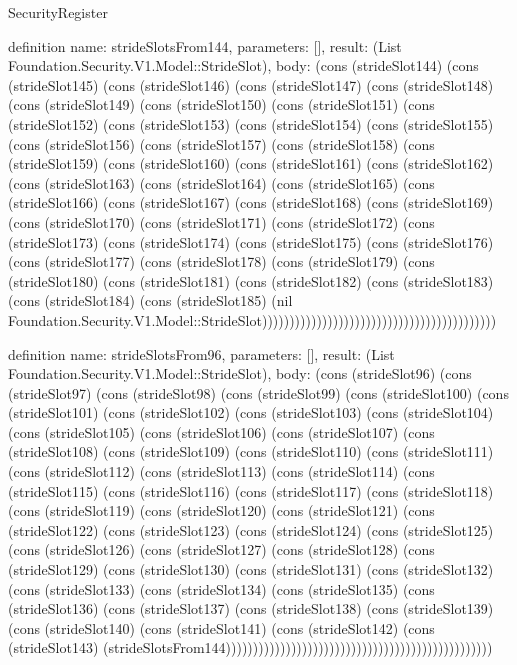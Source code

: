\begin{lexlean}{SecurityRegister}
\begin{semanticmodule}
definition{
  name: strideSlotsFrom144,
  parameters: [],
  result: (List Foundation.Security.V1.Model::StrideSlot),
  body: (cons (strideSlot144) (cons (strideSlot145) (cons (strideSlot146) (cons (strideSlot147) (cons (strideSlot148) (cons (strideSlot149) (cons (strideSlot150) (cons (strideSlot151) (cons (strideSlot152) (cons (strideSlot153) (cons (strideSlot154) (cons (strideSlot155) (cons (strideSlot156) (cons (strideSlot157) (cons (strideSlot158) (cons (strideSlot159) (cons (strideSlot160) (cons (strideSlot161) (cons (strideSlot162) (cons (strideSlot163) (cons (strideSlot164) (cons (strideSlot165) (cons (strideSlot166) (cons (strideSlot167) (cons (strideSlot168) (cons (strideSlot169) (cons (strideSlot170) (cons (strideSlot171) (cons (strideSlot172) (cons (strideSlot173) (cons (strideSlot174) (cons (strideSlot175) (cons (strideSlot176) (cons (strideSlot177) (cons (strideSlot178) (cons (strideSlot179) (cons (strideSlot180) (cons (strideSlot181) (cons (strideSlot182) (cons (strideSlot183) (cons (strideSlot184) (cons (strideSlot185) (nil Foundation.Security.V1.Model::StrideSlot)))))))))))))))))))))))))))))))))))))))))))
}

definition{
  name: strideSlotsFrom96,
  parameters: [],
  result: (List Foundation.Security.V1.Model::StrideSlot),
  body: (cons (strideSlot96) (cons (strideSlot97) (cons (strideSlot98) (cons (strideSlot99) (cons (strideSlot100) (cons (strideSlot101) (cons (strideSlot102) (cons (strideSlot103) (cons (strideSlot104) (cons (strideSlot105) (cons (strideSlot106) (cons (strideSlot107) (cons (strideSlot108) (cons (strideSlot109) (cons (strideSlot110) (cons (strideSlot111) (cons (strideSlot112) (cons (strideSlot113) (cons (strideSlot114) (cons (strideSlot115) (cons (strideSlot116) (cons (strideSlot117) (cons (strideSlot118) (cons (strideSlot119) (cons (strideSlot120) (cons (strideSlot121) (cons (strideSlot122) (cons (strideSlot123) (cons (strideSlot124) (cons (strideSlot125) (cons (strideSlot126) (cons (strideSlot127) (cons (strideSlot128) (cons (strideSlot129) (cons (strideSlot130) (cons (strideSlot131) (cons (strideSlot132) (cons (strideSlot133) (cons (strideSlot134) (cons (strideSlot135) (cons (strideSlot136) (cons (strideSlot137) (cons (strideSlot138) (cons (strideSlot139) (cons (strideSlot140) (cons (strideSlot141) (cons (strideSlot142) (cons (strideSlot143) (strideSlotsFrom144)))))))))))))))))))))))))))))))))))))))))))))))))
}


\end{semanticmodule}
\end{lexlean}
